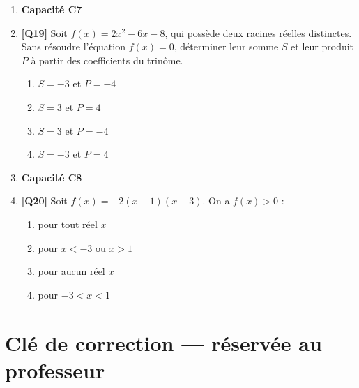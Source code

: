 \begin{enumerate}
\item[] \textbf{Capacité C7}

\item \textbf{[Q19]} Soit $f(x)=2x^2-6x-8$, qui possède deux racines réelles distinctes. Sans résoudre l’équation $f(x)=0$, déterminer leur somme $S$ et leur produit $P$ à partir des coefficients du trinôme.
  \begin{enumerate}[label=\Alph*.]
    \item $S=-3$ et $P=-4$
    \item $S=3$ et $P=4$
    \item $S=3$ et $P=-4$
    \item $S=-3$ et $P=4$
  \end{enumerate}

\item[] \textbf{Capacité C8}

\item \textbf{[Q20]} Soit $f(x)=-2(x-1)(x+3)$. On a $f(x)>0$ :
  \begin{enumerate}[label=\Alph*.]
    \item pour tout réel $x$
    \item pour $x<-3$ ou $x>1$
    \item pour aucun réel $x$
    \item pour $-3<x<1$
  \end{enumerate}

\end{enumerate}

\ifnxVersionProfesseur
\clearpage
\section*{Clé de correction — réservée au professeur}

